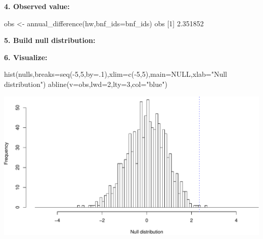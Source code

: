 \documentclass[
]{book}
\newenvironment{Shaded}{\begin{snugshade}}{\end{snugshade}}
\newcommand{\AttributeTok}[1]{\textcolor[rgb]{0.77,0.63,0.00}{#1}}
\newcommand{\ConstantTok}[1]{\textcolor[rgb]{0.00,0.00,0.00}{#1}}
\newcommand{\ControlFlowTok}[1]{\textcolor[rgb]{0.13,0.29,0.53}{\textbf{#1}}}
\newcommand{\DecValTok}[1]{\textcolor[rgb]{0.00,0.00,0.81}{#1}}
\newcommand{\FloatTok}[1]{\textcolor[rgb]{0.00,0.00,0.81}{#1}}
\newcommand{\FunctionTok}[1]{\textcolor[rgb]{0.00,0.00,0.00}{#1}}
\newcommand{\NormalTok}[1]{#1}
\newcommand{\OtherTok}[1]{\textcolor[rgb]{0.56,0.35,0.01}{#1}}
\newcommand{\SpecialCharTok}[1]{\textcolor[rgb]{0.00,0.00,0.00}{#1}}
\newcommand{\StringTok}[1]{\textcolor[rgb]{0.31,0.60,0.02}{#1}}
\begin{document}
\textbf{4. Observed value:}

\begin{Shaded}
\begin{Highlighting}[]
\NormalTok{obs }\OtherTok{\textless{}{-}} \FunctionTok{annual\_difference}\NormalTok{(hw,}\AttributeTok{bnf\_ids=}\NormalTok{bnf\_ids)}
\NormalTok{obs }
\NormalTok{[}\DecValTok{1}\NormalTok{] }\FloatTok{2.351852}
\end{Highlighting}
\end{Shaded}

\textbf{5. Build null distribution:}

\begin{Shaded}
\end{Shaded}

\textbf{6. Visualize:}

\begin{Shaded}
\begin{Highlighting}[]
\FunctionTok{hist}\NormalTok{(nulls,}\AttributeTok{breaks=}\FunctionTok{seq}\NormalTok{(}\SpecialCharTok{{-}}\DecValTok{5}\NormalTok{,}\DecValTok{5}\NormalTok{,}\AttributeTok{by=}\NormalTok{.}\DecValTok{1}\NormalTok{),}\AttributeTok{xlim=}\FunctionTok{c}\NormalTok{(}\SpecialCharTok{{-}}\DecValTok{5}\NormalTok{,}\DecValTok{5}\NormalTok{),}\AttributeTok{main=}\ConstantTok{NULL}\NormalTok{,}\AttributeTok{xlab=}\StringTok{"Null distribution"}\NormalTok{)}
\FunctionTok{abline}\NormalTok{(}\AttributeTok{v=}\NormalTok{obs,}\AttributeTok{lwd=}\DecValTok{2}\NormalTok{,}\AttributeTok{lty=}\DecValTok{3}\NormalTok{,}\AttributeTok{col=}\StringTok{"blue"}\NormalTok{)}
\end{Highlighting}
\end{Shaded}

\includegraphics{figures/unnamed-chunk-417-1.pdf}
\end{document}
